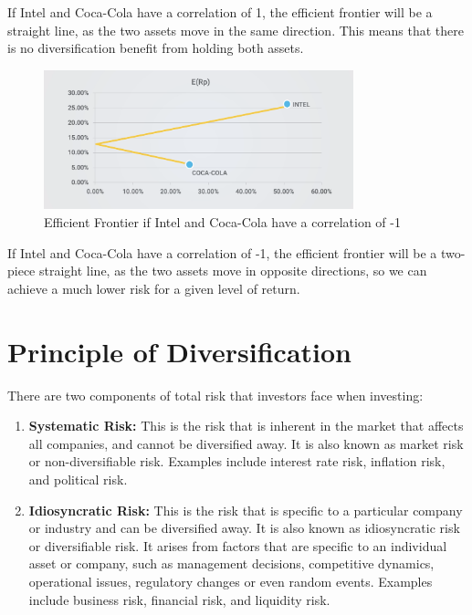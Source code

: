 If Intel and Coca-Cola have a correlation of 1, the efficient frontier will be a straight line, as the two assets move in the same direction. This means that there is no diversification benefit from holding both assets.\\

\begin{figure}[H]
    \centering
    \includegraphics[width=0.8\textwidth]{img/6.2.3.png}
    \caption{Efficient Frontier if Intel and Coca-Cola have a correlation of -1}
    \label{fig:efficient_frontier_3}    
\end{figure}

If Intel and Coca-Cola have a correlation of -1, the efficient frontier will be a two-piece straight line, as the two assets move in opposite directions, so we can achieve a much lower risk for a given level of return.\\





\section{Principle of Diversification}

There are two components of total risk that investors face when investing:

\begin{enumerate}
    \item \textbf{Systematic Risk:} This is the risk that is inherent in the market that affects all companies, and cannot be diversified away. It is also known as market risk or non-diversifiable risk. Examples include interest rate risk, inflation risk, and political risk.
    
    \item \textbf{Idiosyncratic Risk:} This is the risk that is specific to a particular company or industry and can be diversified away. It is also known as idiosyncratic risk or diversifiable risk. It arises from factors that are specific to an individual asset or company, such as management decisions, competitive dynamics, operational issues, regulatory changes or even random events.  Examples include business risk, financial risk, and liquidity risk.
\end{enumerate}

